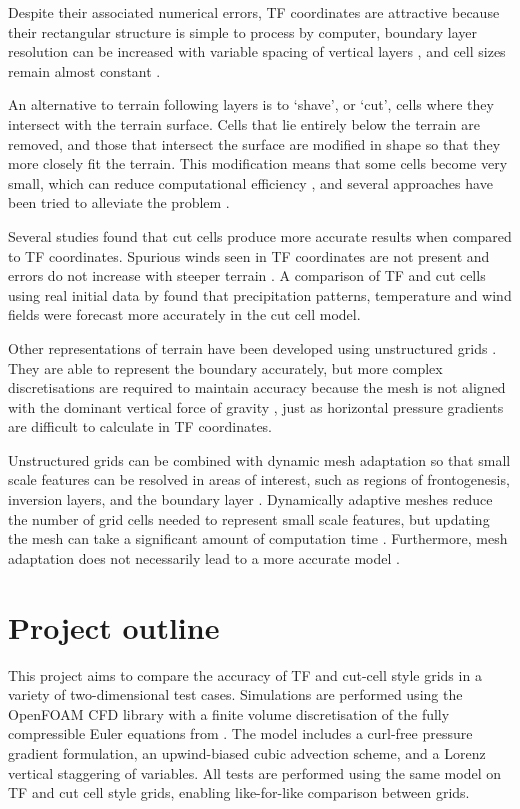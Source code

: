 Despite their associated numerical errors, TF coordinates are attractive because their rectangular structure is simple to process by computer, boundary layer resolution can be increased with variable spacing of vertical layers \autocite{schaer2002}, and cell sizes remain almost constant \autocite{jebens2011}.

An alternative to terrain following layers is to `shave', or `cut', cells where they intersect with the terrain surface.  Cells that lie entirely below the terrain are removed, and those that intersect the surface are modified in shape so that they more closely fit the terrain.  This modification means that some cells become very small, which can reduce computational efficiency \autocite{klein2009}, and several approaches have been tried to alleviate the problem \parencites{steppeler2002}{yamazaki-satomura2010}{jebens2011}.

Several studies found that cut cells produce more accurate results when compared to TF coordinates.  Spurious winds seen in TF coordinates are not present and errors do not increase with steeper terrain \autocite{good2013}.  A comparison of TF and cut cells using real initial data by \textcite{steppeler2006} found that precipitation patterns, temperature and wind fields were forecast more accurately in the cut cell model.  

Other representations of terrain have been developed using unstructured grids \parencites{ss2011}{pain2005}.  They are able to represent the boundary accurately, but more complex discretisations are required to maintain accuracy because the mesh is not aligned with the dominant vertical force of gravity \autocite{rosatti2005}, just as horizontal pressure gradients are difficult to calculate in TF coordinates.

Unstructured grids can be combined with dynamic mesh adaptation so that small scale features can be resolved in areas of interest, such as regions of frontogenesis, inversion layers, and the boundary layer \autocite{browne2014}.  Dynamically adaptive meshes reduce the number of grid cells needed to represent small scale features, but updating the mesh can take a significant amount of computation time \parencites{blaise2012}{browne2014}.  Furthermore, mesh adaptation does not necessarily lead to a more accurate model \autocite{parkinson2014}.

\section{Project outline}
This project aims to compare the accuracy of TF and cut-cell style grids in a variety of two-dimensional test cases.   Simulations are performed using the OpenFOAM CFD library \autocite{openfoam} with a finite volume discretisation of the fully compressible Euler equations from \textcite{weller-shahrokhi2014}.  The model includes a curl-free pressure gradient formulation, an upwind-biased cubic advection scheme, and a Lorenz vertical staggering of variables.  All tests are performed using the same model on TF and cut cell style grids, enabling like-for-like comparison between grids.

